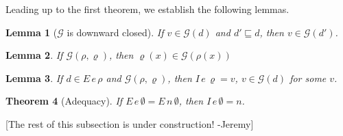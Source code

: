 \documentclass{tufte-handout}
\newtheorem{theorem}{Theorem}%
\newtheorem{lemma}[theorem]{Lemma}
\begin{document}
\noindent Leading up to the first theorem, we establish the following lemmas.

\begin{lemma}[$\mathcal{G}$ is downward closed]
\label{lem:sub-good}
If $v \in \mathcal{G}(d)$ and $d' \sqsubseteq d$, then $v \in \mathcal{G}(d')$.
\end{lemma}

\begin{lemma}
\label{lem:lookup-good}
  If $\mathcal{G}(\rho,\varrho)$,
  then $\varrho(x) \in \mathcal{G}(\rho(x))$
\end{lemma}

\begin{lemma}
  If $d \in E\,e\,\rho$ and $\mathcal{G}(\rho,\varrho)$, then
  $I\,e\,\varrho = v$, $v \in \mathcal{G}(d)$ for some $v$.
\end{lemma}

\begin{theorem}[Adequacy]
If $E\,e\,\emptyset = E\,n\,\emptyset$, then $I\,e\,\emptyset = n$.
\end{theorem}


{\color{red}[The rest of this subsection is under construction! -Jeremy]}



\end{document}
